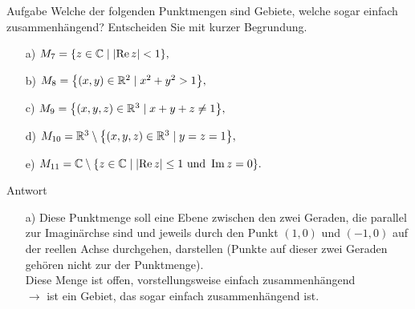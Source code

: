 \documentclass{scrartcl}
\begin{document}
\begin{section}{Aufgabe}
    Welche der folgenden Punktmengen sind Gebiete, welche sogar einfach zusammenhängend?
Entscheiden Sie mit kurzer Begrundung.
\begin{itemize}
    \item[a)] \(M_7=\qty{z\in\mathbb{C}\mid \abs{\Re z}<1},\)
    \item[b)] \(M_8=\qty{\left(x,y\right) \in\mathbb{R}^2 \mid x^2+y^2>1},\)
    \item[c)] \(M_9=\qty{\left(x,y,z\right) \in\mathbb{R}^3 \mid x+y+z\neq 1},\)
    \item[d)] \(M_{10}=\mathbb{R}^3 \setminus \qty{\left(x,y,z\right) \in\mathbb{R}^3 \mid y=z= 1},\)
    \item[e)] \(M_{11}=\mathbb{C} \setminus \qty{z \in\mathbb{C}\mid \abs{\Re z}\leq 1 \text{ und } \Im z=0}.\)
\end{itemize}
      \begin{subsection}{Antwort}
        \begin{itemize}
\item[a)]
Diese Punktmenge soll eine Ebene zwischen den zwei Geraden, die parallel zur Imaginärchse sind und jeweils durch den Punkt $(1,0)$ und $(-1,0)$ auf der reellen Achse durchgehen, darstellen (Punkte auf dieser zwei Geraden gehören nicht zur der Punktmenge).\\
Diese Menge ist offen, vorstellungsweise einfach zusammenhängend \\
$\rightarrow$ ist ein Gebiet, das sogar einfach zusammenhängend ist. \\


\end{itemize}
\end{subsection}
\end{section}
\end{document}
